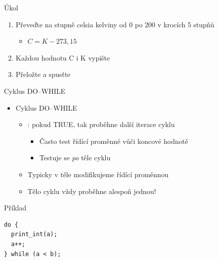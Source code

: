 \begin{frame}{Úkol}

  \begin{enumerate}
    \item Převeďte na stupně celsia kelviny od 0 po 200 v krocích 5 stupňů
    \begin{itemize}
      \item $C = K - 273,15$
    \end{itemize}

    \item Každou hodnotu C i K vypište
    \item Přeložte a spusťte
  \end{enumerate}

\end{frame}

\begin{frame}[fragile]{Cyklus DO--WHILE}

  \begin{itemize}
    \item Cyklus DO--WHILE
    \begin{itemize}
      \item {}: pokud TRUE, tak proběhne další iterace cyklu
      \begin{itemize}
	\item Často test řídící proměnné vůči koncové hodnotě
	\item Testuje se \emph{po} těle cyklu
      \end{itemize}

      \pause

      \item Typicky v těle modifikujeme řídící proměnnou
      \item Tělo cyklu vždy proběhne alespoň jednou!
    \end{itemize}

  \end{itemize}

  \pause

\begin{block}{Příklad}
\begin{lstlisting}
do {
  print_int(a);
  a++;
} while (a < b);
\end{lstlisting}
\end{block}

\end{frame}

